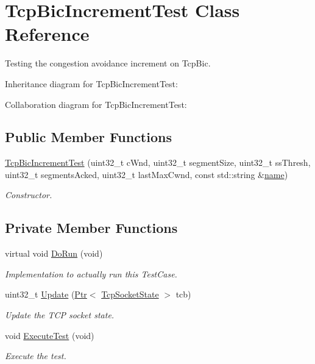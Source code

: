 \hypertarget{classTcpBicIncrementTest}{}\section{Tcp\+Bic\+Increment\+Test Class Reference}
\label{classTcpBicIncrementTest}


Testing the congestion avoidance increment on Tcp\+Bic.  




Inheritance diagram for Tcp\+Bic\+Increment\+Test\+:


Collaboration diagram for Tcp\+Bic\+Increment\+Test\+:
\subsection*{Public Member Functions}
\begin{DoxyCompactItemize}
\item 
\hyperlink{classTcpBicIncrementTest_ae55bf0cb133a9d235fcb428e3dbb02d5}{Tcp\+Bic\+Increment\+Test} (uint32\+\_\+t c\+Wnd, uint32\+\_\+t segment\+Size, uint32\+\_\+t ss\+Thresh, uint32\+\_\+t segments\+Acked, uint32\+\_\+t last\+Max\+Cwnd, const std\+::string \&\hyperlink{generate__test__data__lte__spectrum__model_8m_ab74e6bf80237ddc4109968cedc58c151}{name})
\begin{DoxyCompactList}\small\item\em Constructor. \end{DoxyCompactList}\end{DoxyCompactItemize}
\subsection*{Private Member Functions}
\begin{DoxyCompactItemize}
\item 
virtual void \hyperlink{classTcpBicIncrementTest_af1a3cf3f9ad7abf5fc16edb41bc2351c}{Do\+Run} (void)
\begin{DoxyCompactList}\small\item\em Implementation to actually run this Test\+Case. \end{DoxyCompactList}\item 
uint32\+\_\+t \hyperlink{classTcpBicIncrementTest_a321d4f8f0271fbb45b0105342c857d3c}{Update} (\hyperlink{classns3_1_1Ptr}{Ptr}$<$ \hyperlink{classns3_1_1TcpSocketState}{Tcp\+Socket\+State} $>$ tcb)
\begin{DoxyCompactList}\small\item\em Update the T\+CP socket state. \end{DoxyCompactList}\item 
void \hyperlink{classTcpBicIncrementTest_a7ccf7a79e414db6d12bc4c539d6f2a59}{Execute\+Test} (void)
\begin{DoxyCompactList}\small\item\em Execute the test. \end{DoxyCompactList}\end{DoxyCompactItemize}
